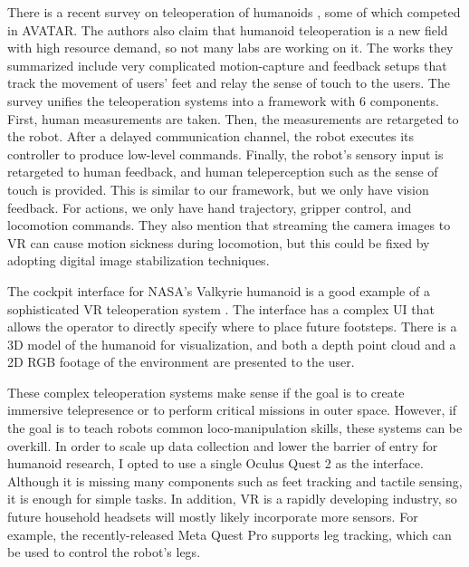 There is a recent survey on teleoperation of humanoids \cite{darvish2023teleoperation},  some of which competed in AVATAR. The authors also claim that humanoid teleoperation is a new field with high resource demand, so not many labs are working on it. The works they summarized include very complicated motion-capture and feedback setups that track the movement of users' feet and relay the sense of touch to the users. The survey unifies the teleoperation systems into a framework with 6 components. First, human measurements are taken. Then, the measurements are retargeted to the robot. After a delayed communication channel, the robot executes its controller to produce low-level commands. Finally, the robot's sensory input is retargeted to human feedback, and human teleperception such as the sense of touch is provided.
This is similar to our framework, but we only have vision feedback. For actions, we only have hand trajectory, gripper control, and locomotion commands. They also mention that streaming the camera images to VR can cause motion sickness during locomotion, but this could be fixed by adopting digital image stabilization techniques.

The cockpit interface for NASA's Valkyrie humanoid is a good example of a sophisticated VR teleoperation system \cite{nasa}. The interface has a complex UI that allows the operator to directly specify where to place future footsteps. There is a 3D model of the humanoid for visualization, and both a depth point cloud and a 2D RGB footage of the environment are presented to the user. 

These complex teleoperation systems make sense if the goal is to create immersive telepresence or to perform critical missions in outer space. However, if the goal is to teach robots common loco-manipulation skills, these systems can be overkill. In order to scale up data collection and lower the barrier of entry for humanoid research, I opted to use a single Oculus Quest 2 as the interface. Although it is missing many components such as feet tracking and tactile sensing, it is enough for simple tasks. In addition, VR is a rapidly developing industry, so future household headsets will mostly likely incorporate more sensors. For example, the recently-released Meta Quest Pro supports leg tracking, which can be used to control the robot's legs.
